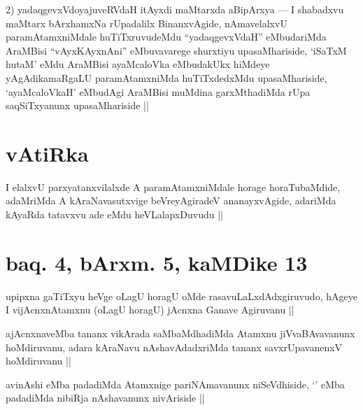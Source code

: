 \begin{artha}
2) yadaqgevxVdoyajuveRVdaH itAyxdi maMtarxda aBipArxya --- I shabadxvu maMtarx bArxhamxNa rUpadalilx BinanxvAgide, nAmavelalxvU paramAtamxniMdale huTiTxruvudeMdu ``yadaqgevxVdaH'' eMbudariMda AraMBisi ``vAyxKAyxnAni'' eMbuvavarege shurxtiyu upasaMhariside, `iSaTxM hutaM' eMdu AraMBisi ayaMcaloVka eMbudakUkx hiMdeye yAgAdikamaRgaLU paramAtamxniMda huTiTxdedxMdu upasaMhariside, `ayaMcaloVkaH' eMbudAgi AraMBisi muMdina garxMthadiMda rUpa saqSiTxyanunx upasaMhariside ||
\end{artha}

\section*{vAtiRka}

\begin{artha}
I elalxvU parxyatanxvilalxde A paramAtamxniMdale horage horaTubaMdide, adaMriMda A kAraNavasutxvige beVreyAgiradeV ananayxvAgide, adariMda kAyaRda tatavxvu ade eMdu heVLalapxDuvudu ||
\end{artha}

\section*{baq. 4, bArxm. 5, kaMDike 13}


\begin{artha}
upipxna gaTiTxyu heVge oLagU horagU oMde rasavuLaLxdAdxgiruvudo, hAgeye I vijAcnxnAtamxnu (oLagU horagU) jAcnxna Ganave Agiruvanu ||
\end{artha}


\begin{artha}
ajAcnxnaveMba tananx vikArada saMbaMdhadiMda Atamxnu jiVvaBAvavanunx hoMdiruvanu, adara kAraNavu nAshavAdadxriMda tananx savxrUpavanenxV hoMdiruvanu ||
\end{artha}


\begin{artha}
avinAshi eMba padadiMda Atamxnige pariNAmavanunx niSeVdhiside, `\stext' eMba padadiMda nibiRja nAshavanunx nivAriside ||
\end{artha}


